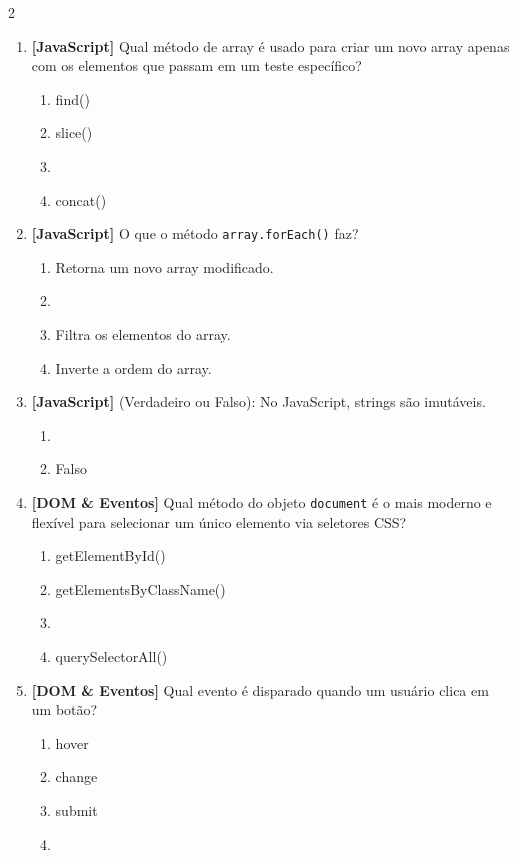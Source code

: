 \documentclass[a4paper,10pt]{article}
\begin{document}
\begin{multicols*}{2}
\begin{enumerate}[label=\textbf{\arabic*.}, resume, leftmargin=*]
\item \textbf{[JavaScript]} Qual método de array é usado para criar um novo array apenas com os elementos que passam em um teste específico?
\begin{enumerate}[label=(\alph*), noitemsep]
  \item find()
  \item slice()
  \item {}
  \item concat()
\end{enumerate}

\item \textbf{[JavaScript]} O que o método \texttt{array.forEach()} faz?
\begin{enumerate}[label=(\alph*), noitemsep]
  \item Retorna um novo array modificado.
  \item {}
  \item Filtra os elementos do array.
  \item Inverte a ordem do array.
\end{enumerate}

\item \textbf{[JavaScript]} (Verdadeiro ou Falso): No JavaScript, strings são imutáveis.
\begin{enumerate}[label=(\alph*), noitemsep]
  \item {}
  \item Falso
\end{enumerate}

\item \textbf{[DOM \& Eventos]} Qual método do objeto \texttt{document} é o mais moderno e flexível para selecionar um único elemento via seletores CSS?
\begin{enumerate}[label=(\alph*), noitemsep]
  \item getElementById()
  \item getElementsByClassName()
  \item {}
  \item querySelectorAll()
\end{enumerate}

\item \textbf{[DOM \& Eventos]} Qual evento é disparado quando um usuário clica em um botão?
\begin{enumerate}[label=(\alph*), noitemsep]
  \item hover
  \item change
  \item submit
  \item {}
\end{enumerate}


\end{enumerate}
\end{multicols*}
\end{document}
